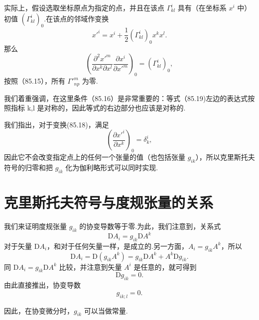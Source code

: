 实际上，假设选取坐标原点为指定的点，并且在该点 $\Gamma^i_{kl}$ 具有（在坐标系 $x^i$ 中）初值 $(\Gamma^i_{kl})_0$.在该点的邻域作变换
\begin{equation}
  x'^i=x^i+\frac{1}{2}\left(\Gamma^i_{kl}\right)_0x^kx^l.
\end{equation}
那么
\begin{equation}
  \left(\frac{\partial^2 x'^m}{\partial x^k\partial x^l}
  \frac{\partial x^i}{\partial x'^m}\right)_0
  =\left(\Gamma^i_{kl}\right)_0,
\end{equation}
按照（85.15），所有 $\Gamma'^m_{np}$ 为零.

我们着重强调，在这里条件（85.16）是非常重要的：等式（85.19)左边的表达式按照指标 k,l 是对称的，因此等式的右边部分也应该是对称的.

我们指出，对于变换(85.18)，满足
\begin{equation*}
  \left(\frac{\partial x'^i}{\partial x^k}\right)_0=\delta^i_k,
\end{equation*}
因此它不会改变指定点上的任何一个张量的值（也包括张量 $g_{ik}$），所以克里斯托夫符号的归零和把 $g_{ik}$ 化为伽利略形式可以同时实现.

\section{克里斯托夫符号与度规张量的关系}

我们来证明度规张量 $g_{ik}$ 的协变导数等于零.为此，我们注意到，关系式
\begin{equation*}
  \mathrm{D}A_i=g_{ik}\mathrm{D}A^k
\end{equation*}
对于矢量 $\mathrm{D}A_i$，和对于任何矢量一样，是成立的.另一方面，$A_i=g_{ik}A^k$，所以
\begin{equation*}
  \mathrm{D}A_i=\mathrm{D}(g_{ik}A^k)
  =g_{ik}\mathrm{D}A^k+A^k\mathrm{D}g_{ik}.
\end{equation*}
同 $\mathrm{D}A_i=g_{ik}\mathrm{D}A^k$ 比较，并注意到矢量 $A^i$ 是任意的，就可得到
\begin{equation*}
  \mathrm{D}g_{ik}=0.
\end{equation*}
由此直接推出，协变导数
\begin{equation}
  g_{ik;l}=0.
\end{equation}

因此，在协变微分时，$g_{ik}$ 可以当做常量.

